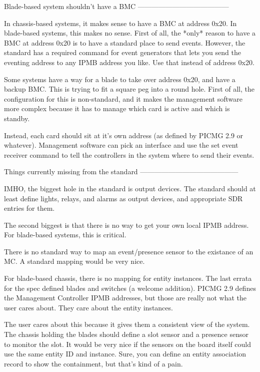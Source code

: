 Blade-based system shouldn't have a BMC
---------------------------------------

In chassis-based systems, it makes sense to have a BMC at address
0x20.  In blade-based systems, this makes no sense.  First of all, the
*only* reason to have a BMC at address 0x20 is to have a standard
place to send events.  However, the standard has a required command
for event generators that lets you send the eventing address to any
IPMB address you like.  Use that instead of address 0x20.

Some systems have a way for a blade to take over address 0x20, and
have a backup BMC.  This is trying to fit a square peg into a round
hole.  First of all, the configuration for this is non-standard, and
it makes the management software more complex because it has to manage
which card is active and which is standby.

Instead, each card should sit at it's own address (as defined by PICMG
2.9 or whatever).  Management software can pick an interface and use
the set event receiver command to tell the controllers in the system
where to send their events.


Things currently missing from the standard
------------------------------------------

IMHO, the biggest hole in the standard is output devices.  The
standard should at least define lights, relays, and alarms as output
devices, and appropriate SDR entries for them.

The second biggest is that there is no way to get your own local IPMB
address.  For blade-based systems, this is critical.

There is no standard way to map an event/presence sensor to the
existance of an MC.  A standard mapping would be very nice.

For blade-based chassis, there is no mapping for entity instances.
The last errata for the spec defined blades and switches (a welcome
addition).  PICMG 2.9 defines the Management Controller IPMB
addresses, but those are really not what the user cares about.  They
care about the entity instances.

The user cares about this because it gives them a consistent view of
the system.  The chassis holding the blades should define a slot
sensor and a presence sensor to monitor the slot.  It would be very
nice if the sensors on the board itself could use the same entity ID
and instance.  Sure, you can define an entity association record to
show the containment, but that's kind of a pain.

